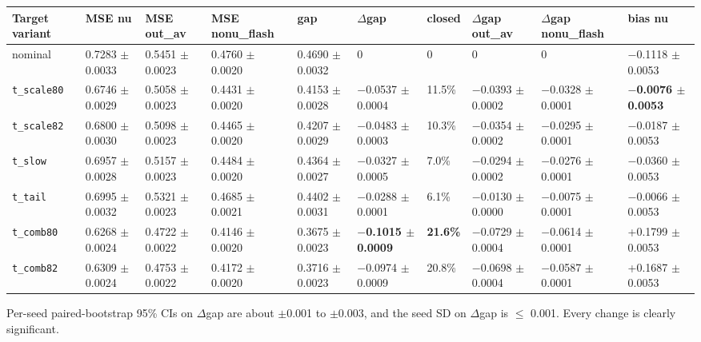 \documentclass[10pt,a4paper]{article}
\begin{document}
\begin{center}\scriptsize
\setlength{\tabcolsep}{3pt}\renewcommand{\arraystretch}{1.15}
\begin{tabularx}{\linewidth}{LLLLLLLLLL}
\toprule
\textbf{Target variant} & \textbf{MSE nu} & \textbf{MSE out\_av} & \textbf{MSE nonu\_flash} & \textbf{gap} & \textbf{$\Delta$gap} & \textbf{closed} & \textbf{$\Delta$gap out\_av} & \textbf{$\Delta$gap nonu\_flash} & \textbf{bias nu} \\
\midrule
nominal & 0.7283 $\pm$ 0.0033 & 0.5451 $\pm$ 0.0023 & 0.4760 $\pm$ 0.0020 & 0.4690 $\pm$ 0.0032 & 0 & 0 & 0 & 0 & $-$0.1118 $\pm$ 0.0053 \\
\texttt{t\_\allowbreak{}scale80} & 0.6746 $\pm$ 0.0029 & 0.5058 $\pm$ 0.0023 & 0.4431 $\pm$ 0.0020 & 0.4153 $\pm$ 0.0028 & $-$0.0537 $\pm$ 0.0004 & 11.5\% & $-$0.0393 $\pm$ 0.0002 & $-$0.0328 $\pm$ 0.0001 & \textbf{$-$0.0076 $\pm$ 0.0053} \\
\texttt{t\_\allowbreak{}scale82} & 0.6800 $\pm$ 0.0030 & 0.5098 $\pm$ 0.0023 & 0.4465 $\pm$ 0.0020 & 0.4207 $\pm$ 0.0029 & $-$0.0483 $\pm$ 0.0003 & 10.3\% & $-$0.0354 $\pm$ 0.0002 & $-$0.0295 $\pm$ 0.0001 & $-$0.0187 $\pm$ 0.0053 \\
\texttt{t\_\allowbreak{}slow} & 0.6957 $\pm$ 0.0028 & 0.5157 $\pm$ 0.0023 & 0.4484 $\pm$ 0.0020 & 0.4364 $\pm$ 0.0027 & $-$0.0327 $\pm$ 0.0005 & 7.0\% & $-$0.0294 $\pm$ 0.0002 & $-$0.0276 $\pm$ 0.0001 & $-$0.0360 $\pm$ 0.0053 \\
\texttt{t\_\allowbreak{}tail} & 0.6995 $\pm$ 0.0032 & 0.5321 $\pm$ 0.0023 & 0.4685 $\pm$ 0.0021 & 0.4402 $\pm$ 0.0031 & $-$0.0288 $\pm$ 0.0001 & 6.1\% & $-$0.0130 $\pm$ 0.0000 & $-$0.0075 $\pm$ 0.0001 & $-$0.0066 $\pm$ 0.0053 \\
\texttt{t\_\allowbreak{}comb80} & 0.6268 $\pm$ 0.0024 & 0.4722 $\pm$ 0.0022 & 0.4146 $\pm$ 0.0020 & 0.3675 $\pm$ 0.0023 & \textbf{$-$0.1015 $\pm$ 0.0009} & \textbf{21.6\%} & $-$0.0729 $\pm$ 0.0004 & $-$0.0614 $\pm$ 0.0001 & +0.1799 $\pm$ 0.0053 \\
\texttt{t\_\allowbreak{}comb82} & 0.6309 $\pm$ 0.0024 & 0.4753 $\pm$ 0.0022 & 0.4172 $\pm$ 0.0020 & 0.3716 $\pm$ 0.0023 & $-$0.0974 $\pm$ 0.0009 & 20.8\% & $-$0.0698 $\pm$ 0.0004 & $-$0.0587 $\pm$ 0.0001 & +0.1687 $\pm$ 0.0053 \\
\bottomrule
\end{tabularx}
\end{center}
Per-seed paired-bootstrap 95\% CIs on $\Delta$gap are about $\pm$0.001 to $\pm$0.003, and the seed SD on $\Delta$gap is $\leq$ 0.001. Every change is clearly significant.
\end{document}
